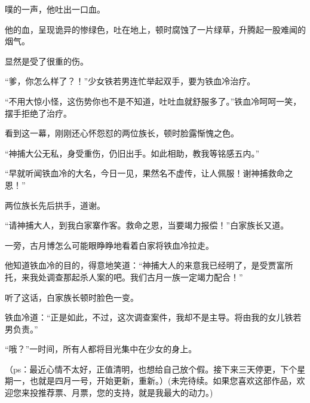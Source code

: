\begin{this_body}
噗的一声，他吐出一口血。

他的血，呈现诡异的惨绿色，吐在地上，顿时腐蚀了一片绿草，升腾起一股难闻的烟气。

显然是受了很重的伤。

“爹，你怎么样了？！”少女铁若男连忙举起双手，要为铁血冷治疗。

“不用大惊小怪，这伤势你也不是不知道，吐吐血就舒服多了。”铁血冷呵呵一笑，摆手拒绝了治疗。

看到这一幕，刚刚还心怀怨怼的两位族长，顿时脸露惭愧之色。

“神捕大公无私，身受重伤，仍旧出手。如此相助，教我等铭感五内。”

“早就听闻铁血冷的大名，今日一见，果然名不虚传，让人佩服！谢神捕救命之恩！”

两位族长先后拱手，道谢。

“请神捕大人，到我白家寨作客。救命之恩，当要竭力报偿！”白家族长又道。

一旁，古月博怎么可能眼睁睁地看着白家将铁血冷拉走。

他知道铁血冷的目的，得意地笑道：“神捕大人的来意我已经明了，是受贾富所托，来我处调查那起杀人案的吧。我们古月一族一定竭力配合！”

听了这话，白家族长顿时脸色一变。

铁血冷道：“正是如此，不过，这次调查案件，我却不是主导。将由我的女儿铁若男负责。”

“哦？”一时间，所有人都将目光集中在少女的身上。

（ps：最近心情不太好，正值清明，也想给自己放个假。接下来三天停更，下个星期一，也就是四月一号，开始更新，重新。）(未完待续。如果您喜欢这部作品，欢迎您来投推荐票、月票，您的支持，就是我最大的动力。)

\end{this_body}

